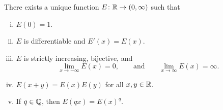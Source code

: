 \begin{prop}
There exists a unique function $E \colon {\mathbb{R}} \to (0,\infty)$ such that
\begin{enumerate}[(i)]
\item \label{it:exp:i}
$E(0) = 1$.
\item \label{it:exp:ii}
$E$ is differentiable and $E'(x) = E(x)$.
\item \label{it:exp:iii}
$E$ is strictly increasing, bijective, and
\begin{equation*}
\lim_{x\to -\infty} E(x) = 0 , \qquad \text{and} \qquad
\lim_{x\to \infty} E(x) = \infty .
\end{equation*}
\item \label{it:exp:iv}
$E(x+y) = E(x)E(y)$ for all $x,y \in {\mathbb{R}}$.
\item \label{it:exp:v}
If $q \in {\mathbb{Q}}$, then
$E(qx) = {E(x)}^q$.
\end{enumerate}
\end{prop}

